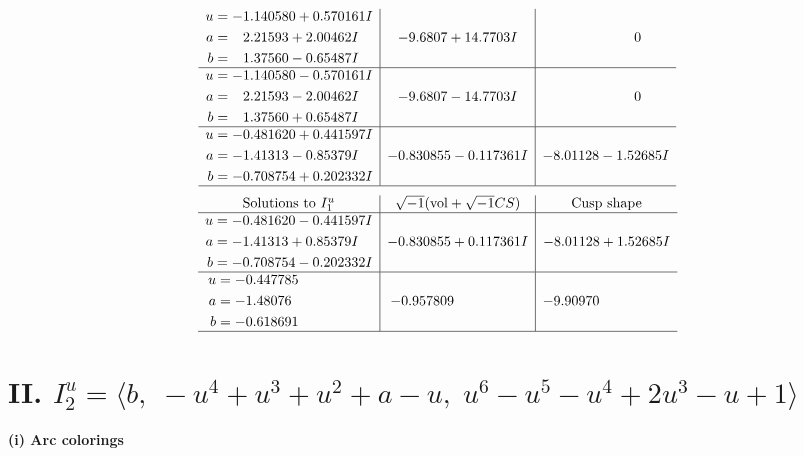 \documentclass[1p]{elsarticle_modified}
\theoremstyle{definition}
\newcommand{\I}{\sqrt{-1}}
\begin{document}
$$\begin{array}{c|c|c}
\begin{aligned}
u &= -1.140580 + 0.570161 I \\
a &= \phantom{-}2.21593 + 2.00462 I \\
b &= \phantom{-}1.37560 - 0.65487 I\end{aligned}
 & -9.6807 + 14.7703 I & \phantom{-0.000000 } 0 \\ \hline\begin{aligned}
u &= -1.140580 - 0.570161 I \\
a &= \phantom{-}2.21593 - 2.00462 I \\
b &= \phantom{-}1.37560 + 0.65487 I\end{aligned}
 & -9.6807 - 14.7703 I & \phantom{-0.000000 } 0 \\ \hline\begin{aligned}
u &= -0.481620 + 0.441597 I \\
a &= -1.41313 - 0.85379 I \\
b &= -0.708754 + 0.202332 I\end{aligned}
 & -0.830855 - 0.117361 I & -8.01128 - 1.52685 I\\
 \hline 
 \end{array}$$\newpage$$\begin{array}{c|c|c}  
\text{Solutions to }I^u_{1}& \I (\text{vol} + \sqrt{-1}CS) & \text{Cusp shape}\\
 \hline 
\begin{aligned}
u &= -0.481620 - 0.441597 I \\
a &= -1.41313 + 0.85379 I \\
b &= -0.708754 - 0.202332 I\end{aligned}
 & -0.830855 + 0.117361 I & -8.01128 + 1.52685 I \\ \hline\begin{aligned}
u &= -0.447785\phantom{ +0.000000I} \\
a &= -1.48076\phantom{ +0.000000I} \\
b &= -0.618691\phantom{ +0.000000I}\end{aligned}
 & -0.957809\phantom{ +0.000000I} & -9.90970\phantom{ +0.000000I}\\
 \hline 
 \end{array}$$\newpage\newpage\renewcommand{\arraystretch}{1}
\centering \section*{II. $I^u_{2}= \langle b,\;- u^4+u^3+u^2+a- u,\;u^6- u^5- u^4+2 u^3- u+1 \rangle$}
\flushleft \textbf{(i) Arc colorings}\\
\end{document}
